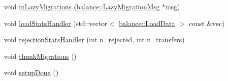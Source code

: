 \begin{DoxyCompactItemize}
\item 
void \hyperlink{structvt_1_1vrt_1_1collection_1_1lb_1_1_tempered_l_b_aa072b3bf3c82899d3228096b60de1647}{in\+Lazy\+Migrations} (\hyperlink{structvt_1_1vrt_1_1collection_1_1balance_1_1_lazy_migration_msg}{balance\+::\+Lazy\+Migration\+Msg} $\ast$msg)
\item 
void \hyperlink{structvt_1_1vrt_1_1collection_1_1lb_1_1_tempered_l_b_a8bc08859b2c38e6fa0c6f0d0262f8118}{load\+Stats\+Handler} (std\+::vector$<$ \hyperlink{structvt_1_1vrt_1_1collection_1_1balance_1_1_load_data}{balance\+::\+Load\+Data} $>$ const \&vec)
\item 
void \hyperlink{structvt_1_1vrt_1_1collection_1_1lb_1_1_tempered_l_b_a0880a16358ee528c868186ceaed9245f}{rejection\+Stats\+Handler} (int n\+\_\+rejected, int n\+\_\+transfers)
\item 
void \hyperlink{structvt_1_1vrt_1_1collection_1_1lb_1_1_tempered_l_b_ad17685a3f16fd1e56e7db27b6ab702ca}{thunk\+Migrations} ()
\item 
void \hyperlink{structvt_1_1vrt_1_1collection_1_1lb_1_1_tempered_l_b_abd832c27fec041a5cce45d0a41585c3d}{setup\+Done} ()
\end{DoxyCompactItemize}
